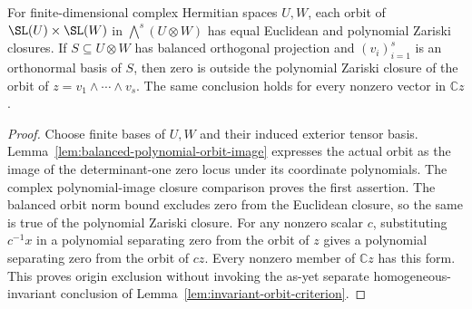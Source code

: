 \begin{lemma}
\label{lem:balanced-plucker-algebraic-exclusion}
\leanok
{}
For finite-dimensional complex Hermitian spaces $U,W$, each orbit of
$\SL(U)\times\SL(W)$ in $\bigwedge^s(U\otimes W)$ has equal Euclidean
and polynomial Zariski closures. If $S\subseteq U\otimes W$ has balanced
orthogonal projection and $(v_i)_{i=1}^s$ is an orthonormal basis of $S$,
then zero is outside the polynomial Zariski closure of the orbit of
$z=v_1\wedge\cdots\wedge v_s$. The same conclusion holds for every
nonzero vector in $\mathbb C z$.
\end{lemma}
\begin{proof}
Choose finite bases of $U,W$ and their induced exterior tensor basis.
Lemma~\ref{lem:balanced-polynomial-orbit-image} expresses the actual
orbit as the image of the determinant-one zero locus under its coordinate
polynomials. The complex polynomial-image closure comparison proves the
first assertion. The balanced orbit norm bound excludes zero from the
Euclidean closure, so the same is true of the polynomial Zariski closure.
For any nonzero scalar $c$, substituting $c^{-1}x$ in a polynomial
separating zero from the orbit of $z$ gives a polynomial separating zero
from the orbit of $cz$. Every nonzero member of $\mathbb C z$ has this
form. This proves origin exclusion without invoking the as-yet separate
homogeneous-invariant conclusion of Lemma~\ref{lem:invariant-orbit-criterion}.
\end{proof}

